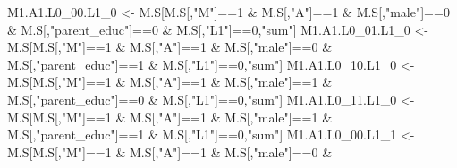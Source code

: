 \documentclass[
]{book}
\newenvironment{Shaded}{\begin{snugshade}}{\end{snugshade}}
\newcommand{\DecValTok}[1]{\textcolor[rgb]{0.00,0.00,0.81}{#1}}
\newcommand{\NormalTok}[1]{#1}
\newcommand{\OtherTok}[1]{\textcolor[rgb]{0.56,0.35,0.01}{#1}}
\newcommand{\SpecialCharTok}[1]{\textcolor[rgb]{0.00,0.00,0.00}{#1}}
\newcommand{\StringTok}[1]{\textcolor[rgb]{0.31,0.60,0.02}{#1}}
\begin{document}
\begin{Shaded}
\begin{Highlighting}[]
\NormalTok{  M1.A1.L0\_00.L1\_0 }\OtherTok{\textless{}{-}}\NormalTok{ M.S[M.S[,}\StringTok{"M"}\NormalTok{]}\SpecialCharTok{==}\DecValTok{1} \SpecialCharTok{\&}\NormalTok{ M.S[,}\StringTok{"A"}\NormalTok{]}\SpecialCharTok{==}\DecValTok{1} \SpecialCharTok{\&}\NormalTok{ M.S[,}\StringTok{"male"}\NormalTok{]}\SpecialCharTok{==}\DecValTok{0} \SpecialCharTok{\&} 
\NormalTok{                            M.S[,}\StringTok{"parent\_educ"}\NormalTok{]}\SpecialCharTok{==}\DecValTok{0} \SpecialCharTok{\&}\NormalTok{ M.S[,}\StringTok{"L1"}\NormalTok{]}\SpecialCharTok{==}\DecValTok{0}\NormalTok{,}\StringTok{"sum"}\NormalTok{]}
\NormalTok{  M1.A1.L0\_01.L1\_0 }\OtherTok{\textless{}{-}}\NormalTok{ M.S[M.S[,}\StringTok{"M"}\NormalTok{]}\SpecialCharTok{==}\DecValTok{1} \SpecialCharTok{\&}\NormalTok{ M.S[,}\StringTok{"A"}\NormalTok{]}\SpecialCharTok{==}\DecValTok{1} \SpecialCharTok{\&}\NormalTok{ M.S[,}\StringTok{"male"}\NormalTok{]}\SpecialCharTok{==}\DecValTok{0} \SpecialCharTok{\&} 
\NormalTok{                            M.S[,}\StringTok{"parent\_educ"}\NormalTok{]}\SpecialCharTok{==}\DecValTok{1} \SpecialCharTok{\&}\NormalTok{ M.S[,}\StringTok{"L1"}\NormalTok{]}\SpecialCharTok{==}\DecValTok{0}\NormalTok{,}\StringTok{"sum"}\NormalTok{]}
\NormalTok{  M1.A1.L0\_10.L1\_0 }\OtherTok{\textless{}{-}}\NormalTok{ M.S[M.S[,}\StringTok{"M"}\NormalTok{]}\SpecialCharTok{==}\DecValTok{1} \SpecialCharTok{\&}\NormalTok{ M.S[,}\StringTok{"A"}\NormalTok{]}\SpecialCharTok{==}\DecValTok{1} \SpecialCharTok{\&}\NormalTok{ M.S[,}\StringTok{"male"}\NormalTok{]}\SpecialCharTok{==}\DecValTok{1} \SpecialCharTok{\&} 
\NormalTok{                            M.S[,}\StringTok{"parent\_educ"}\NormalTok{]}\SpecialCharTok{==}\DecValTok{0} \SpecialCharTok{\&}\NormalTok{ M.S[,}\StringTok{"L1"}\NormalTok{]}\SpecialCharTok{==}\DecValTok{0}\NormalTok{,}\StringTok{"sum"}\NormalTok{]}
\NormalTok{  M1.A1.L0\_11.L1\_0 }\OtherTok{\textless{}{-}}\NormalTok{ M.S[M.S[,}\StringTok{"M"}\NormalTok{]}\SpecialCharTok{==}\DecValTok{1} \SpecialCharTok{\&}\NormalTok{ M.S[,}\StringTok{"A"}\NormalTok{]}\SpecialCharTok{==}\DecValTok{1} \SpecialCharTok{\&}\NormalTok{ M.S[,}\StringTok{"male"}\NormalTok{]}\SpecialCharTok{==}\DecValTok{1} \SpecialCharTok{\&} 
\NormalTok{                            M.S[,}\StringTok{"parent\_educ"}\NormalTok{]}\SpecialCharTok{==}\DecValTok{1} \SpecialCharTok{\&}\NormalTok{ M.S[,}\StringTok{"L1"}\NormalTok{]}\SpecialCharTok{==}\DecValTok{0}\NormalTok{,}\StringTok{"sum"}\NormalTok{]}
\NormalTok{  M1.A1.L0\_00.L1\_1 }\OtherTok{\textless{}{-}}\NormalTok{ M.S[M.S[,}\StringTok{"M"}\NormalTok{]}\SpecialCharTok{==}\DecValTok{1} \SpecialCharTok{\&}\NormalTok{ M.S[,}\StringTok{"A"}\NormalTok{]}\SpecialCharTok{==}\DecValTok{1} \SpecialCharTok{\&}\NormalTok{ M.S[,}\StringTok{"male"}\NormalTok{]}\SpecialCharTok{==}\DecValTok{0} \SpecialCharTok{\&} 

\end{Highlighting}
\end{Shaded}
\end{document}
